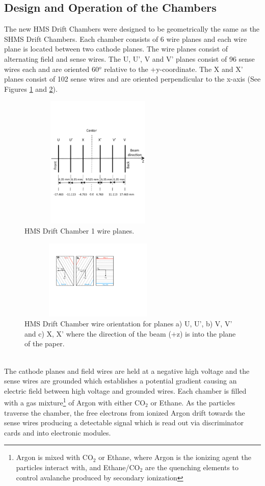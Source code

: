 \documentclass[letterpaper, 12 pt, conference]{ieeeconf}  %
\begin{document}
\subsection{Design and Operation of the Chambers}
\noindent The new HMS Drift Chambers were designed to be geometrically the same as the SHMS Drift Chambers. Each chamber consists of 6 wire planes and each wire
plane is located between two cathode planes. The wire planes consist of alternating field and sense wires. The U, U', V and V' planes consist of
96 sense wires each and are oriented 60$^{o}$ relative to the +y-coordinate. The X and X' planes consist of 102 sense wires and are oriented perpendicular to the x-axis (See
Figures \ref{fig:dc1_planes} and \ref{fig:dc_wires}).\\
\begin{figure}[h!]
  \centering
  \includegraphics[width=3.0in, height=2.5in]{dc2_tests/HMS_DC1_Planes.pdf}
  \caption{HMS Drift Chamber 1 wire planes.}
  \label{fig:dc1_planes}
\end{figure}
\begin{figure}[h!]
  \centering
  \includegraphics[width=3.0in, height=1.5in]{dc2_tests/HMS_DC_Wires.pdf}
  \caption{HMS Drift Chamber wire orientation for planes a) U, U', b) V, V' and c) X, X' where
  the direction of the beam (+z) is into the plane of the paper.}
  \label{fig:dc_wires}
\end{figure}\\
\indent The cathode planes and field wires are held at a negative high voltage and the sense wires are grounded which establishes a potential gradient causing an electric field
between high voltage and grounded wires. Each chamber is filled with a gas mixture\footnote{Argon is mixed with CO$_{2}$ or Ethane, where Argon is the ionizing agent the
particles interact with, and Ethane/CO$_{2}$ are the quenching elements to control avalanche produced by secondary ionization} of Argon with either CO$_{2}$ or Ethane.
As the particles traverse the chamber, the free electrons from ionized Argon drift towards the sense wires producing a detectable signal which is read out via discriminator
cards and into electronic modules.
\end{document}

